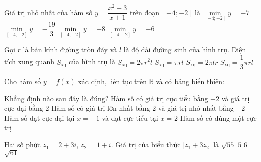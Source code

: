 \begin{ex}%
Giá trị nhỏ nhất của hàm số $y = \dfrac{x^2 + 3}{x + 1}$ trên đoạn $[-4; -2]$ là
\choice
{\True $\min\limits_{[-4; -2]} y = -7$}
{$\min\limits_{[-4; -2]} y = -\dfrac{19}{3}$}
{$\min\limits_{[-4; -2]} y = -8$}
{$\min\limits_{[-4; -2]} y = -6$}
\end{ex}

\begin{ex}%
Gọi $r$ là bán kính đường tròn đáy và $l$ là độ dài đường sinh của hình trụ. Diện tích xung quanh $S_{\mathrm{xq}}$ của hình trụ là
\choice
{$S_{\mathrm{xq}} = 2\pi r^2l$}
{$S_{\mathrm{xq}} = \pi rl$}
{\True $S_{\mathrm{xq}} = 2\pi lr$}
{$S_{\mathrm{xq}} = \dfrac{1}{3}\pi rl$}
\end{ex}

\begin{ex}%
Cho hàm số $y = f(x)$ xác định, liên tục trên $\mathbb{R}$ và có bảng biến thiên:
\begin{center}
\end{center}
Khẳng định nào sau đây là đúng?
\choice
{\True Hàm số có giá trị cực tiểu bằng $-2$ và giá trị cực đại bằng $2$}
{Hàm số có giá trị lớn nhất bằng $2$ và giá trị nhỏ nhất bằng $-2$}
{Hàm số đạt cực đại tại $x = -1$ và đạt cực tiểu tại $x = 2$}
{Hàm số có đúng một cực trị}
\end{ex}

\begin{ex}%
Hai số phức $z_1 = 2 + 3i$, $z_2 = 1 + i$. Giá trị của biểu thức $|z_1 + 3z_2|$ là
\choice
{$\sqrt{55}$}
{$5$}
{$6$}
{\True $\sqrt{61}$}
\end{ex}

